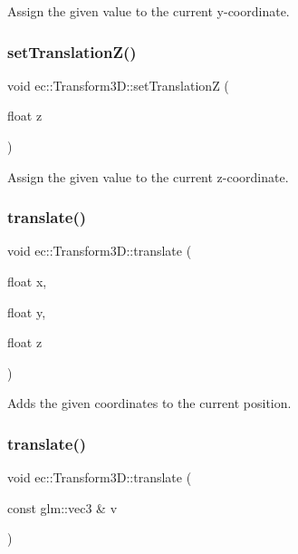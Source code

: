 Assign the given value to the current y-\/coordinate. \mbox{\label{classec_1_1_transform3_d_aeddca7f4f74afd8394810222684fad30}} 
\subsubsection{\texorpdfstring{set\+Translation\+Z()}{setTranslationZ()}}
{\footnotesize\ttfamily void ec\+::\+Transform3\+D\+::set\+TranslationZ (\begin{DoxyParamCaption}\item[{float}]{z }\end{DoxyParamCaption})}

Assign the given value to the current z-\/coordinate. \mbox{\label{classec_1_1_transform3_d_a9c143bdc0bf020940b9b6bd7e2a01d45}} 
\subsubsection{\texorpdfstring{translate()}{translate()}\hspace{0.1cm}{\footnotesize\ttfamily [1/2]}}
{\footnotesize\ttfamily void ec\+::\+Transform3\+D\+::translate (\begin{DoxyParamCaption}\item[{float}]{x,  }\item[{float}]{y,  }\item[{float}]{z }\end{DoxyParamCaption})}

Adds the given coordinates to the current position. \mbox{\label{classec_1_1_transform3_d_ae0290297c16ee5ce4f6cf2855fd26aa0}} 
\subsubsection{\texorpdfstring{translate()}{translate()}\hspace{0.1cm}{\footnotesize\ttfamily [2/2]}}
{\footnotesize\ttfamily void ec\+::\+Transform3\+D\+::translate (\begin{DoxyParamCaption}\item[{const glm\+::vec3 \&}]{v }\end{DoxyParamCaption})}

